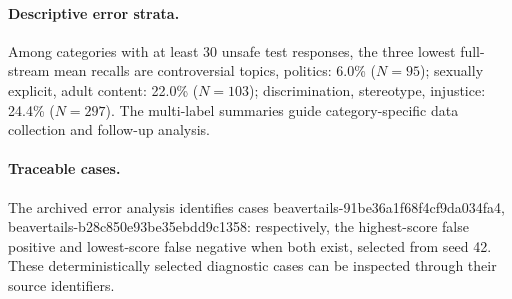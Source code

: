 \paragraph{Descriptive error strata.}Among categories with at least 30 unsafe test responses, the three lowest full-stream mean recalls are controversial topics, politics: 6.0\% ($N=95$); sexually explicit, adult content: 22.0\% ($N=103$); discrimination, stereotype, injustice: 24.4\% ($N=297$). The multi-label summaries guide category-specific data collection and follow-up analysis.

\paragraph{Traceable cases.}The archived error analysis identifies cases beavertails-91be36a1f68f4cf9da034fa4, beavertails-b28c850e93be35ebdd9c1358: respectively, the highest-score false positive and lowest-score false negative when both exist, selected from seed 42. These deterministically selected diagnostic cases can be inspected through their source identifiers.

